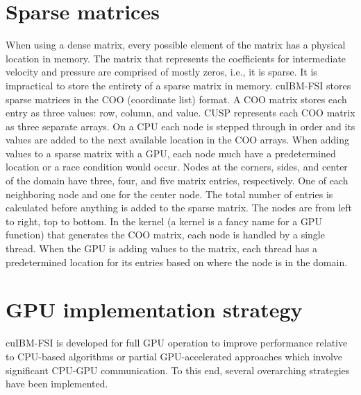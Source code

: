 \section{Sparse matrices}
When using a dense matrix, every possible element of the matrix has a physical location in memory. 
The matrix that represents the coefficients for intermediate velocity and pressure are comprised of mostly zeros, i.e., it is sparse. 
It is impractical to store the entirety of a sparse matrix in memory. 
cuIBM-FSI stores sparse matrices in the COO (coordinate list) format. 
A COO matrix stores each entry as three values: row, column, and value. 
CUSP represents each COO matrix as three separate arrays. 
On a CPU each node is stepped through in order and its values are added to the next available location in the COO arrays. 
When adding values to a sparse matrix with a GPU, each node much have a predetermined location or a race condition would occur. 
Nodes at the corners, sides, and center of the domain have three, four, and five matrix entries, respectively. 
One of each neighboring node and one for the center node. 
The total number of entries is calculated before anything is added to the sparse matrix. 
The nodes are from left to right, top to bottom. 
In the kernel (a kernel is a fancy name for a GPU function) that generates the COO matrix, each node is handled by a single thread. 
When the GPU is adding values to the matrix, each thread has a predetermined location for its entries based on where the node is in the domain. 



\section{GPU implementation strategy}
\label{GPU implementation strategy}
cuIBM-FSI is developed for full GPU operation to improve performance relative to CPU-based algorithms or partial GPU-accelerated approaches which involve significant CPU-GPU communication. 
To this end, several overarching strategies have been implemented. 

